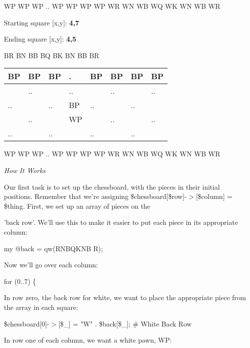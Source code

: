 \documentclass[a4paper,11pt]{book}
\begin{document}
\noindent WP  WP WP .. WP WP WP WP WR  WN WB WQ WK WN WB WR

\noindent 

\noindent Starting square [x,y]: \textbf{4,7}

\noindent 

\noindent Ending square [x,y]: \textbf{4,5}

\noindent BR   BN  BB  BQ  BK  BN  BB  BR

\begin{tabular}{|p{0.4in}|p{0.2in}|p{0.2in}|p{0.2in}|p{0.2in}|p{0.2in}|p{0.2in}|p{0.1in}|} \hline 
BP & BP & BP & . & BP & BP & BP & BP \\ \hline 
 & .. &  & .. &  & .. &  & .. \\ \hline 
.. &  & .. & BP & .. &  & .. &  \\ \hline 
 & .. &  & WP &  & .. &  & .. \\ \hline 
.. &  & .. &  & .. &  & .. &  \\ \hline 
\end{tabular}

WP  WP WP .. WP WP WP WP WR  WN WB WQ WK WN WB WR

\noindent 

\noindent \textit{How It Works}

\noindent Our first task is to set up the chessboard, with the pieces in their initial positions. Remember that we're assigning \$chessboard[\$row]-$>$[\$column] = \$thing. First, we set up an array of pieces on the

\noindent 'back row'. We'll use this to make it easier to put each piece in its appropriate column:

\noindent 

\noindent my @back = qw(RNBQKNB R);

\noindent 

\noindent Now we'll go over each column:

\noindent 

\noindent for (0..7) \{

\noindent 

\noindent In  row  zero,  the back row  for  white,  we want  to  place  the  appropriate  piece  from  the array  in each square:

\noindent 

\noindent \$chessboard[0]-$>$[\$\_] = "W" . \$back[\$\_]; \# White Back Row

\noindent 

\noindent 

\noindent In row one of each column, we want a white pawn, WP:
\end{document}
